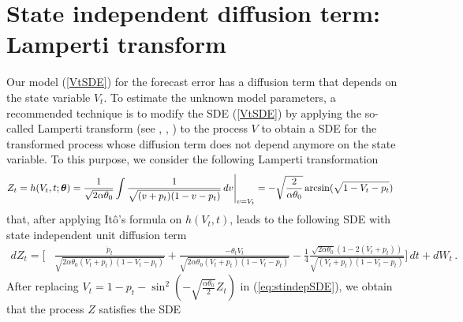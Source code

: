 \documentclass[11pt]{article}
\theoremstyle{definition}
\begin{document}


\section{State independent diffusion term: Lamperti transform} \label{Section_4}

Our model (\ref{VtSDE}) for the forecast error has a diffusion term that depends on the state variable $V_t$. To estimate the unknown model parameters, a recommended technique is to modify the SDE (\ref{VtSDE}) by applying the so-called Lamperti transform (see \cite[40--41]{iacus1}, \cite{moma}, \cite[98--100]{saso}) to the process $V$ to obtain a SDE for the transformed process whose diffusion term does not depend anymore on the state variable. To this purpose, we consider the following Lamperti transformation  
\begin{align}
Z_t = h(V_t, t; \bm{\theta} )  & = \frac{1}{\sqrt{2 \alpha \theta_0 }} \int \frac{1}{\sqrt{(v + p_t)(1 - v - p_t)}} \,dv \Bigg{\vert}_{v = V_t}   = - \sqrt{ \frac{2}{ \alpha \theta_0 }} \arcsin (\sqrt{ 1 - V_t - p_t}) \label{eq:LampZ}
\end{align}
that, after applying It\^{o}'s formula on $h(V_t, t)$, leads to the following SDE with state independent unit diffusion term
\begin{align}
dZ_t = \Bigg[  & \frac{\dot{p}_t}{ \sqrt{2 \alpha \theta_0 (V_t + p_t)(1 - V_t - p_t)}}  + \frac{- \theta_t V_t}{ \sqrt{2  \alpha \theta_0 (V_t + p_t)(1 - V_t - p_t)}} - \frac{1}{4} \frac{\sqrt{2 \alpha \theta_0} \left( 1 - 2 (V_t + p_t)\right)}{\sqrt{(V_t + p_t)(1 - V_t - p_t)}}  \Bigg] \,dt + dW_t \,. \label{eq:stindepSDE}
\end{align}
After replacing $V_t = 1 - p_t - \sin^2 \left(- \sqrt{ \frac{ \alpha \theta_0}{2} } Z_t \right) $ in (\ref{eq:stindepSDE}), we obtain that the  process $Z$ satisfies the SDE
\end{document}
